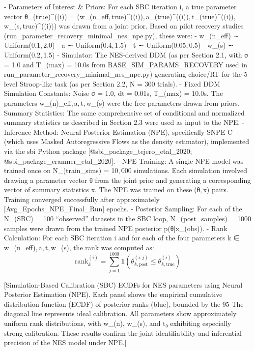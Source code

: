 - Parameters of Interest & Priors: For each SBC iteration i, a true
  parameter vector
  θ_(true)^((i)) = (w_(n_eff, true)^((i)), a_(true)^((i)), t_(true)^((i)), w_(s, true)^((i)))
  was drawn from a joint prior. Based on pilot recovery studies
  (run_parameter_recovery_minimal_nes_npe.py), these were:
  - w_(n_eff) ∼ Uniform(0.1, 2.0)
  - a ∼ Uniform(0.4, 1.5)
  - t ∼ Uniform(0.05, 0.5)
  - w_(s) ∼ Uniform(0.2, 1.5)
- Simulator: The NES-derived DDM (as per Section 2.1, with σ = 1.0 and
  T_(max) = 10.0s from BASE_SIM_PARAMS_RECOVERY used in
  run_parameter_recovery_minimal_nes_npe.py) generating choice/RT for
  the 5-level Stroop-like task (as per Section 2.2, N = 300 trials).
- Fixed DDM Simulation Constants: Noise σ = 1.0, dt = 0.01s,
  T_(max) = 10.0s. The parameters w_(n)_eff, a, t, w_(s) were the free
  parameters drawn from priors.
- Summary Statistics: The same comprehensive set of conditional and
  normalized summary statistics as described in Section 2.3 were used as
  input to the NPE.
- Inference Method: Neural Posterior Estimation (NPE), specifically
  SNPE-C (which uses Masked Autoregressive Flows as the density
  estimator), implemented via the sbi Python package
  [@sbi_package_tejero_etal_2020; @sbi_package_cranmer_etal_2020].
- NPE Training: A single NPE model was trained once on
  N_(train_sims) = 10, 000 simulations. Each simulation involved drawing
  a parameter vector θ from the joint prior and generating a
  corresponding vector of summary statistics x. The NPE was trained on
  these (θ, x) pairs. Training converged successfully after
  approximately [Avg_Epochs_NPE_Final_Run] epochs.
- Posterior Sampling: For each of the N_(SBC) = 100 “observed” datasets
  in the SBC loop, N_(post_samples) = 1000 samples were drawn from the
  trained NPE posterior p(θ|x_(obs)).
- Rank Calculation: For each SBC iteration i and for each of the four
  parameters k ∈ {w_(n_eff), a, t, w_(s)}, the rank was computed as:
  $$
  \mathrm{rank}^{(i)}_k = \sum_{j=1}^{1000} \mathbf{1}\left(\theta_{k,\mathrm{post}}^{(i,j)} \leq \theta_{k,\mathrm{true}}^{(i)}\right)
  $$

[Simulation-Based Calibration (SBC) ECDFs for NES parameters using
Neural Posterior Estimation (NPE). Each panel shows the empirical
cumulative distribution function (ECDF) of posterior ranks (blue),
bounded by the 95%
The diagonal line represents ideal calibration. All parameters show
approximately uniform rank distributions, with w_(n), w_(s), and t₀
exhibiting especially strong calibration. These results confirm the
joint identifiability and inferential precision of the NES model under
NPE.]

